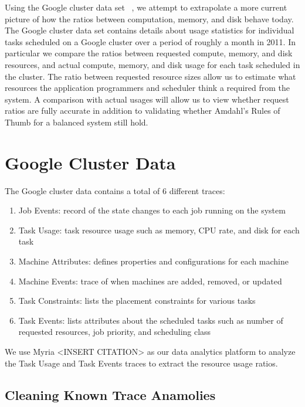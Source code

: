 \documentclass{sig-alternate}
\begin{document}
Using the Google cluster data set ~\cite{clusterdata:Wilkes2011, clusterdata:Reiss2011}, we attempt to extrapolate a more current picture of how the ratios between computation, memory, and disk behave today.
The Google cluster data set contains details about usage statistics for individual tasks scheduled on a Google cluster over a period of roughly a month in 2011.
In particular we compare the ratios between requested compute, memory, and disk resources, and actual compute, memory, and disk usage for each task scheduled in the cluster.
The ratio between requested resource sizes allow us to estimate what resources the application programmers and scheduler think a required from the system.
A comparison with actual usages will allow us to view whether request ratios are fully accurate in addition to validating whether Amdahl's Rules of Thumb for a balanced system still hold.



\section{Google Cluster Data}

The Google cluster data contains a total of 6 different traces:
\begin{enumerate}
\item Job Events: record of the state changes to each job running on the system
\item Task Usage: task resource usage such as memory, CPU rate, and disk for each task
\item Machine Attributes: defines properties and configurations for each machine
\item Machine Events: trace of when machines are added, removed, or updated
\item Task Constraints: lists the placement constraints for various tasks
\item Task Events: lists attributes about the scheduled tasks such as number of requested resources, job priority, and scheduling class
\end{enumerate}
We use Myria <INSERT CITATION> as our data analytics platform to analyze the Task Usage and Task Events traces to extract the resource usage ratios.

\subsection{Cleaning Known Trace Anamolies}
\end{document}
